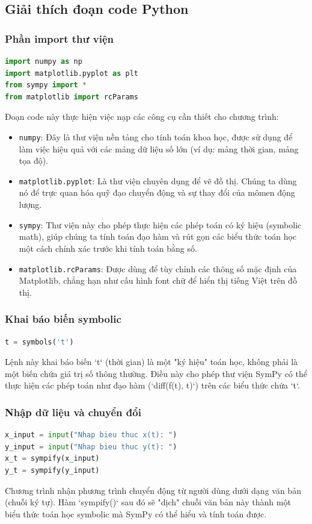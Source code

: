\documentclass{report}
\begin{document}
\subsection{Giải thích đoạn code Python}

\subsubsection{Phần import thư viện}
\begin{lstlisting}[language=Python]
import numpy as np
import matplotlib.pyplot as plt
from sympy import *
from matplotlib import rcParams
\end{lstlisting}
Đoạn code này thực hiện việc nạp các công cụ cần thiết cho chương trình:
\begin{itemize}
    \item \texttt{numpy}: Đây là thư viện nền tảng cho tính toán khoa học, được sử dụng để làm việc hiệu quả với các mảng dữ liệu số lớn (ví dụ: mảng thời gian, mảng tọa độ).
    \item \texttt{matplotlib.pyplot}: Là thư viện chuyên dụng để vẽ đồ thị. Chúng ta dùng nó để trực quan hóa quỹ đạo chuyển động và sự thay đổi của mômen động lượng.
    \item \texttt{sympy}: Thư viện này cho phép thực hiện các phép toán có ký hiệu (symbolic math), giúp chúng ta tính toán đạo hàm và rút gọn các biểu thức toán học một cách chính xác trước khi tính toán bằng số.
    \item \texttt{matplotlib.rcParams}: Được dùng để tùy chỉnh các thông số mặc định của Matplotlib, chẳng hạn như cấu hình font chữ để hiển thị tiếng Việt trên đồ thị.
\end{itemize}

\subsubsection{Khai báo biến symbolic}
\begin{lstlisting}[language=Python]
t = symbols('t')
\end{lstlisting}
Lệnh này khai báo biến `t` (thời gian) là một "ký hiệu" toán học, không phải là một biến chứa giá trị số thông thường. Điều này cho phép thư viện SymPy có thể thực hiện các phép toán như đạo hàm (`diff(f(t), t)`) trên các biểu thức chứa `t`.

\subsubsection{Nhập dữ liệu và chuyển đổi}
\begin{lstlisting}[language=Python]
x_input = input("Nhap bieu thuc x(t): ")
y_input = input("Nhap bieu thuc y(t): ")
x_t = sympify(x_input)
y_t = sympify(y_input)
\end{lstlisting}
Chương trình nhận phương trình chuyển động từ người dùng dưới dạng văn bản (chuỗi ký tự). Hàm `sympify()` sau đó sẽ "dịch" chuỗi văn bản này thành một biểu thức toán học symbolic mà SymPy có thể hiểu và tính toán được.
\end{document}

